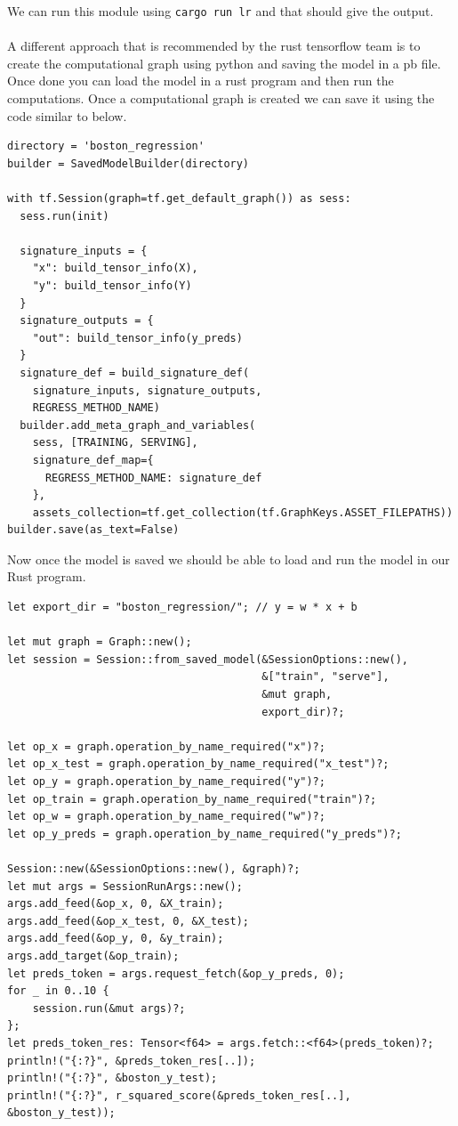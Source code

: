 \documentclass{book}
\begin{document}
We can run this module using \lstinline{cargo run lr} and that should give the output.

\paragraph{}%
A different approach that is recommended by the rust tensorflow team is to create the computational graph using python and saving the model in a pb file. Once done you can load the model in a rust program and then run the computations. Once a computational graph is created we can save it using the code similar to below.

\begin{lstlisting}[caption={chapter2\\/rust\_and\_tf\\/tensorflow\%20create\%20model\\.ipynb}]
directory = 'boston_regression'
builder = SavedModelBuilder(directory)

with tf.Session(graph=tf.get_default_graph()) as sess:
  sess.run(init)

  signature_inputs = {
    "x": build_tensor_info(X),
    "y": build_tensor_info(Y)
  }
  signature_outputs = {
    "out": build_tensor_info(y_preds)
  }
  signature_def = build_signature_def(
    signature_inputs, signature_outputs,
    REGRESS_METHOD_NAME)
  builder.add_meta_graph_and_variables(
    sess, [TRAINING, SERVING],
    signature_def_map={
      REGRESS_METHOD_NAME: signature_def
    },
    assets_collection=tf.get_collection(tf.GraphKeys.ASSET_FILEPATHS))
builder.save(as_text=False)
\end{lstlisting}

Now once the model is saved we should be able to load and run the model in our Rust program.

\begin{lstlisting}[caption={}]
let export_dir = "boston_regression/"; // y = w * x + b

let mut graph = Graph::new();
let session = Session::from_saved_model(&SessionOptions::new(),
                                        &["train", "serve"],
                                        &mut graph,
                                        export_dir)?;

let op_x = graph.operation_by_name_required("x")?;
let op_x_test = graph.operation_by_name_required("x_test")?;
let op_y = graph.operation_by_name_required("y")?;
let op_train = graph.operation_by_name_required("train")?;
let op_w = graph.operation_by_name_required("w")?;
let op_y_preds = graph.operation_by_name_required("y_preds")?;

Session::new(&SessionOptions::new(), &graph)?;
let mut args = SessionRunArgs::new();
args.add_feed(&op_x, 0, &X_train);
args.add_feed(&op_x_test, 0, &X_test);
args.add_feed(&op_y, 0, &y_train);
args.add_target(&op_train);
let preds_token = args.request_fetch(&op_y_preds, 0);
for _ in 0..10 {
    session.run(&mut args)?;
};
let preds_token_res: Tensor<f64> = args.fetch::<f64>(preds_token)?;
println!("{:?}", &preds_token_res[..]);
println!("{:?}", &boston_y_test);
println!("{:?}", r_squared_score(&preds_token_res[..], &boston_y_test));
\end{lstlisting}
\end{document}
